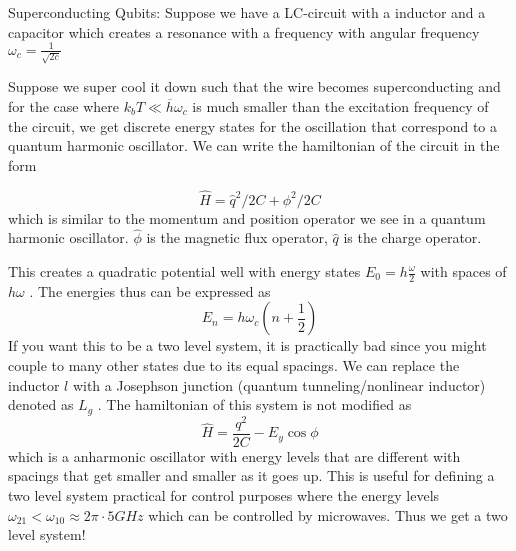 \begin{eg}
Superconducting Qubits: Suppose we have a LC-circuit with a inductor and a capacitor which
creates a resonance with a frequency with angular frequency \(\omega_c = \frac{1}{\sqrt{2c} }\)

Suppose we super cool it down such that the wire becomes superconducting
and for the case where \(k_b T \ll  \overline{h} \omega_c\) is much smaller than the excitation frequency of the 
circuit, we get discrete energy states for the oscillation that correspond to a 
quantum harmonic oscillator. We can write the hamiltonian of the circuit in the form

\[
  \hat{H}  = \hat{q}^{2}/{2C} + \phi ^{2} /{2C}
\]
which is similar to the momentum and position operator we see in a quantum harmonic oscillator. 
\(\hat{\phi }\) is the magnetic flux operator, \(\hat{q}\) is the charge operator. 

This creates a quadratic potential well with energy states \(E_0 = h \frac{\omega}{2}\) with
spaces of \(h \omega \) . The energies thus can be expressed as 
\[
  E_n = h \omega_c (n + \frac{1}{2})
\]
If you want this to be a two level system, it is practically bad since you might couple to many other states due to
its equal spacings. 
We can replace the inductor \(l\) with a Josephson junction (quantum tunneling/nonlinear inductor)
denoted as \(L_g\) . The hamiltonian of this system is not modified as 
\[
  \hat{H} = \frac{q^2}{2C} -E_y \cos \phi 
\]
which is a anharmonic oscillator with energy levels that are different with 
spacings that get smaller and smaller as it goes up. This is useful for defining
a two level system practical for control purposes where the energy levels 
\(\omega _{21} < \omega _{10} \approx 2 \pi \cdot 5 GHz\) which can be controlled by microwaves. 
Thus we get a two level system!

\end{eg}

